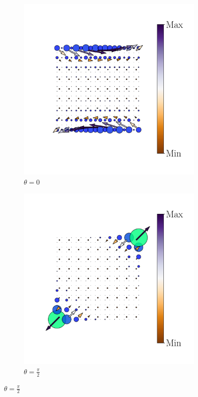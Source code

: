 \begin{figure}[h!]
\begin{minipage}[h!]{1.1\textwidth}
\begin{subfigure}[b!]{0.2 \textwidth}
         \end{subfigure}\hspace*{-0.5em}
          \begin{subfigure}[b!]{0.2 \textwidth}
             \caption*{$\theta = 0$}
             \includegraphics[width=\textwidth]{Imagenes/Resultados_pump_Cuadrado/x/hoti_pomp_x_pos3.pdf}
         \end{subfigure}\hspace*{-0.5em}
          \begin{subfigure}[b!]{0.2 \textwidth}
             \caption*{$\theta = \frac{\pi}{2}$}
             \includegraphics[width=\textwidth]{Imagenes/Resultados_pump_Cuadrado/x/hoti_pomp_x_pos4.pdf}

\end{subfigure}
\end{minipage}
\end{figure}
